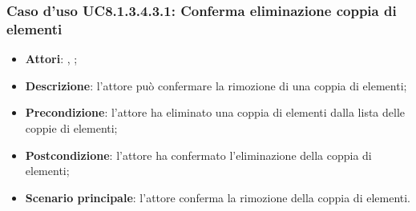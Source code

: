 		\subsubsection{Caso d'uso UC8.1.3.4.3.1: Conferma eliminazione coppia di elementi}
		\label{UC8.1.3.4.3.1}
		\begin{itemize}
			\item \textbf{Attori}: \uau, \uaupro;
			\item \textbf{Descrizione}: l'attore può confermare la rimozione di una coppia di elementi;
			\item \textbf{Precondizione}: l'attore ha eliminato una coppia di elementi dalla lista delle coppie di elementi;
			\item \textbf{Postcondizione}: l'attore ha confermato l'eliminazione della coppia di elementi;
			\item \textbf{Scenario principale}: l'attore conferma la rimozione della coppia di elementi.
		\end{itemize}

